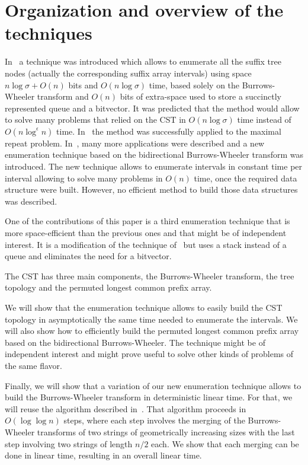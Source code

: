 \documentclass[a4paper]{article}
\begin{document}
\section{Organization and overview of the techniques}
In~\cite{BGOS11,BGOS13} a technique was introduced which allows to enumerate 
all the suffix tree nodes (actually the corresponding suffix array intervals) 
using space $n\log\sigma+O(n)$ bits and $O(n\log\sigma)$ time,
based solely on the Burrows-Wheeler transform and $O(n)$ bits of extra-space 
used to store a succinctly represented queue and a bitvector. 
It was predicted that the method would allow to solve many problems 
that relied on the \textsc{CST} in $O(n\log\sigma)$ time instead of $O(n\log^\epsilon n)$
time. In~\cite{BBO12} the method was successfully applied to the maximal repeat problem. 
In~\cite{BCKM13}, many more applications were described and 
a new enumeration technique based on the bidirectional Burrows-Wheeler transform
was introduced. 
The new technique allows to enumerate intervals in constant time per interval allowing to solve 
many problems in $O(n)$ time, once the required data structure were built. 
However, no efficient method to build those data structures was described. 

One of the contributions of this paper is a third enumeration technique that is more 
space-efficient than the 
previous ones and that might be of independent interest. 
It is a modification of the technique of~\cite{BGOS13} 
but uses a stack instead of a queue and eliminates the need for
a bitvector. 

The \textsc{CST} has three main components, the Burrows-Wheeler 
transform, the tree topology and the permuted longest common prefix 
array. 

We will show that the enumeration 
technique allows to easily build the \textsc{CST} topology in asymptotically 
the same time needed to enumerate the intervals. 
We will also show how to efficiently build the permuted longest common prefix array 
based on the bidirectional Burrows-Wheeler. The technique might be of independent 
interest and might prove useful to solve other kinds of problems of the same flavor. 

Finally, we will show that a variation of our new enumeration technique 
allows to build the Burrows-Wheeler transform in deterministic linear time. 
For that, we will reuse the algorithm described in~\cite{HSS09}. 
That algorithm proceeds in $O(\log\log n)$ steps, where each step 
involves the merging of the Burrows-Wheeler transforms of two strings 
of geometrically increasing sizes with the last step involving 
two strings of length $n/2$ each. 
We show that each merging can be done in linear time, resulting in an 
overall linear time. 
\end{document}
